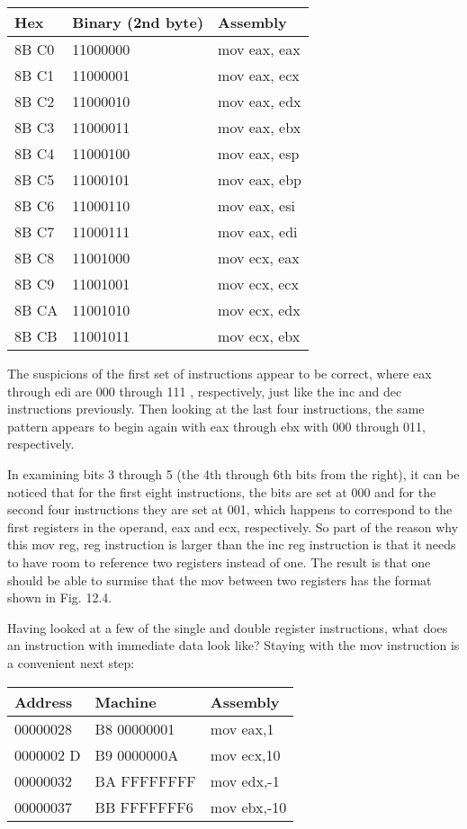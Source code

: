 \documentclass[10pt]{article}
\begin{document}
\begin{center}
\begin{tabular}{|l|l|l|}
\hline
Hex & Binary (2nd byte) & Assembly \\
\hline
8B C0 & 11000000 & mov eax, eax \\
\hline
8B C1 & 11000001 & mov eax, ecx \\
\hline
8B C2 & 11000010 & mov eax, edx \\
\hline
8B C3 & 11000011 & mov eax, ebx \\
\hline
8B C4 & 11000100 & mov eax, esp \\
\hline
8B C5 & 11000101 & mov eax, ebp \\
\hline
8B C6 & 11000110 & mov eax, esi \\
\hline
8B C7 & 11000111 & mov eax, edi \\
\hline
8B C8 & 11001000 & mov ecx, eax \\
\hline
8B C9 & 11001001 & mov ecx, ecx \\
\hline
8B CA & 11001010 & mov ecx, edx \\
\hline
8B CB & 11001011 & mov ecx, ebx \\
\hline
\end{tabular}
\end{center}

The suspicions of the first set of instructions appear to be correct, where eax through edi are 000 through 111 , respectively, just like the inc and dec instructions previously. Then looking at the last four instructions, the same pattern appears to begin again with eax through ebx with 000 through 011, respectively.

In examining bits 3 through 5 (the 4th through 6th bits from the right), it can be noticed that for the first eight instructions, the bits are set at 000 and for the second four instructions they are set at 001, which happens to correspond to the first registers in the operand, eax and ecx, respectively. So part of the reason why this mov reg, reg instruction is larger than the inc reg instruction is that it needs to have room to reference two registers instead of one. The result is that one should be able to surmise that the mov between two registers has the format shown in Fig. 12.4.

Having looked at a few of the single and double register instructions, what does an instruction with immediate data look like? Staying with the mov instruction is a convenient next step:

\begin{center}
\begin{tabular}{|l|l|l|}
\hline
Address & Machine & Assembly \\
\hline
00000028 & B8 00000001 & mov eax,1 \\
\hline
0000002 D & B9 0000000A & mov ecx,10 \\
\hline
00000032 & BA FFFFFFFF & mov edx,-1 \\
\hline
00000037 & BB FFFFFFF6 & mov ebx,-10 \\
\hline
\end{tabular}
\end{center}
\end{document}
